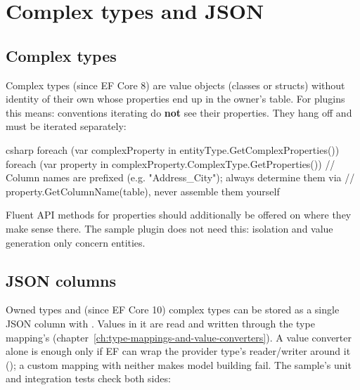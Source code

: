 \chapter{Complex types and JSON}\label{ch:complex-types-and-json}

\section{Complex types}

Complex types (since EF Core 8) are value objects (classes or structs) without identity of
their own whose properties
end up in the owner's table. For plugins this means: conventions iterating
 do
\textbf{not} see their properties. They hang off  and
must be iterated separately:

\begin{sourcecode}{csharp}
foreach (var complexProperty in entityType.GetComplexProperties())
{
    foreach (var property in complexProperty.ComplexType.GetProperties())
    {
        // Column names are prefixed (e.g. "Address_City"); always determine them via
        // property.GetColumnName(table), never assemble them yourself
    }
}
\end{sourcecode}

Fluent API methods for properties should additionally be offered on
 where they make
sense there. The sample plugin does not need this: isolation and value generation only
concern entities.

\section{JSON columns}

Owned types and (since EF Core 10) complex types can be stored as a single JSON column with
. Values in it are read and written through the
type mapping's 
(chapter~\ref{ch:type-mappings-and-value-converters}). A value converter alone is enough only
if EF can wrap the provider type's reader/writer around it
(); a
custom mapping with neither makes model building fail. The sample's unit and integration tests check both sides:


